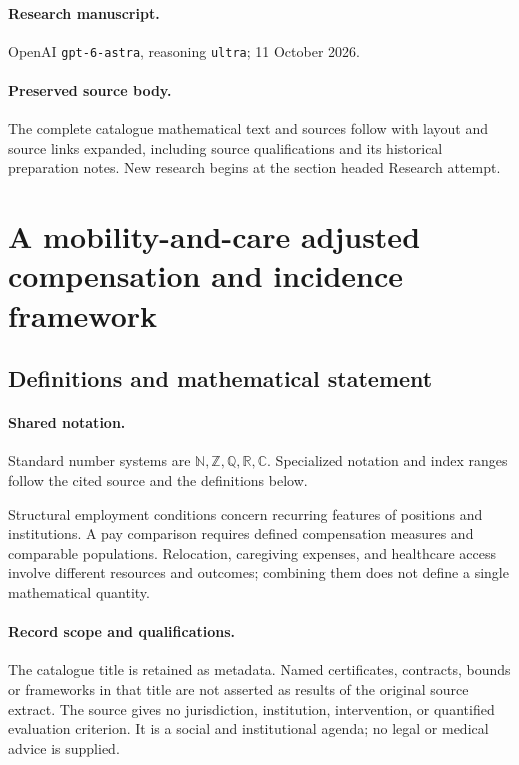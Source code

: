 \documentclass[11pt]{article}
\begin{document}
\paragraph{Research manuscript.} OpenAI \texttt{gpt-6-astra}, reasoning \texttt{ultra}; 11 October 2026.
\paragraph{Preserved source body.} The complete catalogue mathematical text and sources follow with layout and source links expanded, including source qualifications and its historical preparation notes. New research begins at the section headed Research attempt.

\section{A mobility-and-care adjusted compensation and incidence framework}\label{statement}

\subsection{Definitions and mathematical statement}

\paragraph{Shared notation.}Standard number systems are $\mathbb N,\mathbb Z,\mathbb Q,\mathbb R,\mathbb C$. Specialized notation and index ranges follow the cited source and the definitions below.


Structural employment conditions concern recurring features of positions and institutions. A pay comparison requires defined compensation measures and comparable populations. Relocation, caregiving expenses, and healthcare access involve different resources and outcomes; combining them does not define a single mathematical quantity.
\paragraph{Record scope and qualifications.}
The catalogue title is retained as metadata. Named certificates, contracts, bounds or frameworks in that title are not asserted as results of the original source extract.
The source gives no jurisdiction, institution, intervention, or quantified evaluation criterion. It is a social and institutional agenda; no legal or medical advice is supplied.
\end{document}
